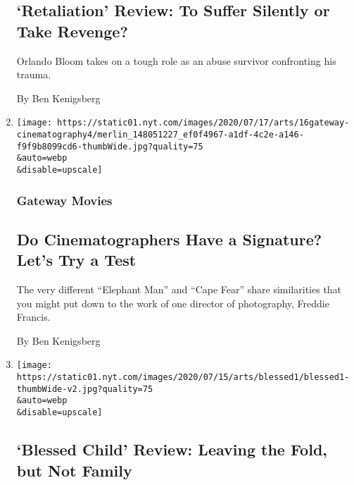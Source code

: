 \begin{enumerate}
  \hypertarget{retaliation-review-to-suffer-silently-or-take-revenge}{%
  \subsection{`Retaliation' Review: To Suffer Silently or Take
  Revenge?}\label{retaliation-review-to-suffer-silently-or-take-revenge}}

  Orlando Bloom takes on a tough role as an abuse survivor confronting
  his trauma.

  By Ben Kenigsberg
\item
  \href{/2020/07/16/movies/cape-fear-elephant-man.html}{}

  \texttt{[image: https://static01.nyt.com/images/2020/07/17/arts/16gateway-cinematography4/merlin\_148051227\_ef0f4967-a1df-4c2e-a146-f9f9b8099cd6-thumbWide.jpg?quality=75\\\&auto=webp\\\&disable=upscale]}

  \hypertarget{gateway-movies-1}{%
  \subsubsection{Gateway Movies}\label{gateway-movies-1}}

  \hypertarget{do-cinematographers-have-a-signature-lets-try-a-test}{%
  \subsection{Do Cinematographers Have a Signature? Let's Try a
  Test}\label{do-cinematographers-have-a-signature-lets-try-a-test}}

  The very different ``Elephant Man'' and ``Cape Fear'' share
  similarities that you might put down to the work of one director of
  photography, Freddie Francis.

  By Ben Kenigsberg
\item
  \href{/2020/07/16/movies/blessed-child-review.html}{}

  \texttt{[image: https://static01.nyt.com/images/2020/07/15/arts/blessed1/blessed1-thumbWide-v2.jpg?quality=75\\\&auto=webp\\\&disable=upscale]}

  \hypertarget{blessed-child-review-leaving-the-fold-but-not-family}{%
  \subsection{`Blessed Child' Review: Leaving the Fold, but Not
  Family}\label{blessed-child-review-leaving-the-fold-but-not-family}}


\end{enumerate}
